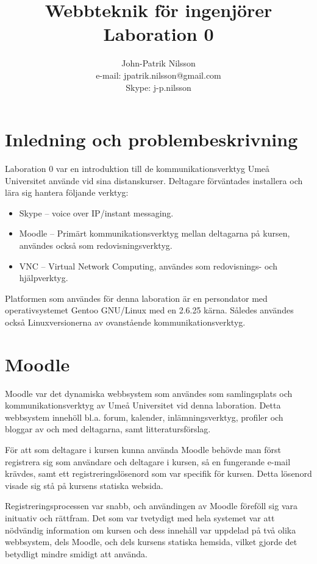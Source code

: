 \documentclass[a4paper,10pt]{article}
\title{Webbteknik för ingenjörer \\
	Laboration 0}
\author{John-Patrik Nilsson \\
	e-mail: jpatrik.nilsson@gmail.com \\
	Skype: j-p.nilsson}
\begin{document}
\maketitle

\pagestyle{empty}
\thispagestyle{empty}

\section{Inledning och problembeskrivning}
Laboration 0 var en introduktion till de kommunikationsverktyg Umeå Universitet använde vid sina distanskurser. Deltagare förväntades installera och lära sig hantera följande verktyg:
\begin{itemize}
\item Skype -- voice over IP/instant messaging.
\item Moodle -- Primärt kommunikationsverktyg mellan deltagarna på kursen, användes också som redovisningsverktyg.
\item VNC -- Virtual Network Computing, användes som redovisnings- och hjälpverktyg.
\end{itemize}

Platformen som användes för denna laboration är en persondator med operativsystemet Gentoo GNU/Linux med en 2.6.25 kärna. Således användes också Linuxversionerna av ovanstående kommunikationsverktyg.

\section{Moodle}
Moodle var det dynamiska webbsystem som användes som samlingsplats och kommunikationsverktyg av Umeå Universitet vid denna laboration. Detta webbsystem innehöll bl.a. forum, kalender, inlämningsverktyg, profiler och bloggar av och med deltagarna, samt litteratursförslag. 

För att som deltagare i kursen kunna använda Moodle behövde man först registrera sig som användare och deltagare i kursen, så en fungerande e-mail krävdes, samt ett registreringslösenord som var specifik för kursen. Detta lösenord visade sig stå på kursens statiska websida. 

Registreringsprocessen var snabb, och användingen av Moodle föreföll sig vara inituativ och rättfram. Det som var tvetydigt med hela systemet var att nödvändig information om kursen och dess innehåll var uppdelad på två olika webbsystem, dels Moodle, och dels kursens statiska hemsida, vilket gjorde det betydligt mindre smidigt att använda.
\end{document}
